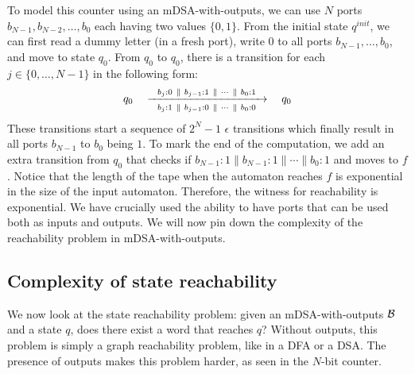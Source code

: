 To model this counter using an mDSA-with-outputs, we can use $N$ ports $b_{N-1}, b_{N-2}, \dots, b_0$ each having two values $\{0, 1\}$. From the initial state $q^{init}$, we can first read a dummy letter (in a fresh port), write $0$ to all ports $b_{N-1}, \dots, b_0$, and move to state $q_0$. From $q_{0}$ to $q_{0}$, there is a transition for each $j \in \{0, \dots, N-1\}$ in the following form: 
\begin{align*}
q_0 \quad \xrightarrow[~~b_j:1 ~\parallel~ b_{j-1}:0 ~\parallel~ \cdots ~\parallel~ b_0: 0~~]{ b_j:0 ~\parallel~ b_{j-1}:1 ~\parallel~ \cdots ~\parallel~ b_0: 1} \quad q_0
\end{align*}
These transitions start a sequence of $2^N -1$ $\epsilon$ transitions which finally result in all ports $b_{N-1}$ to $b_0$ being $1$. To mark the end of the computation, we add an extra transition from $q_0$ that checks if $b_{N-1}:1 \parallel b_{N-1}:1 \parallel \cdots \parallel b_0:1$ and moves to $f$. Notice that the length of the tape when the automaton reaches $f$ is exponential in the size of the input automaton. Therefore, the witness for reachability is exponential. We have crucially used the ability to have ports that can be used both as inputs and outputs. We will now pin down the complexity of the reachability problem in mDSA-with-outputs. 

\subsection{Complexity of state reachability}

We now look at the state reachability problem: given an mDSA-with-outputs $\mathcal{B}$ and a state $q$, does there exist a word that reaches $q$? Without outputs, this problem is simply a graph reachability problem, like in a DFA or a DSA. The presence of outputs makes this problem harder, as seen in the $N$-bit counter.




\endinput
In order to represent Expressive Decision Tables (EDTs) succinctly, we require an additional feature in the automaton -- the presence of output ports and more importantly input/output (IO) ports. When a transition is matched, we also require a certain output to be produced in an output port. Sometimes, these output ports can also be treated as inputs and checked for suffixes in the transition labels. Such ports will be called IO ports. Addition of these special ports enables a clean translation of EDTs to mDSAs. At the same time, as we will see, they make the emptiness problem significantly more complex. 

